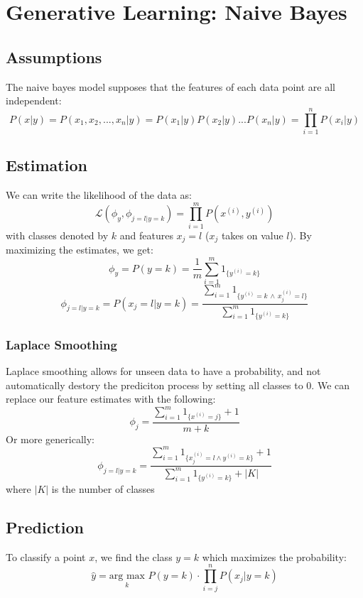 \documentclass[twoside,twocolumn]{article}
\begin{document}
\section{Generative Learning: Naive Bayes}
\subsection{Assumptions}
The naive bayes model supposes that the features of each data point are all
independent:
\begin{equation}
  P(x|y)=P(x_1,x_2,...,x_n|y)=P(x_1|y)P(x_2|y)...P(x_n|y)=\prod_{i=1}^nP(x_i|y)
\end{equation}
\subsection{Estimation}
We can write the likelihood of the data as:
\begin{equation}
  \mathcal{L}(\phi_y, \phi_{j=l|y=k}) = \prod_{i=1}^m P(x^{(i)}, y^{(i)})
\end{equation}
with classes denoted by $k$ and features $x_j = l$ ($x_j$ takes on value $l$).
By maximizing the estimates, we get:
\begin{equation}
  \phi_y = P(y=k)=\frac{1}{m} \sum_{i=1}^m 1_{\{y^{(i)}=k\}}
\end{equation}
\begin{equation}
  \phi_{j=l|y=k} = P(x_j=l|y=k)= \frac{ \sum_{i=1}^m 1_{\{y^{(i)}=k \, \wedge \, x_j^{(i)} = l\}} }{ \sum_{i=1}^m 1_{\{y^{(i)}=k\}} }
\end{equation}
\subsubsection{Laplace Smoothing}
Laplace smoothing allows for unseen data to have a probability, and not automatically
destory the prediciton process by setting all classes to $0$. We can replace
our feature estimates with the following:
\begin{equation}
  \phi_j = \frac{ \sum_{i=1}^m 1_{\{x^{(i)}=j\}} +1} { m + k }
\end{equation}
Or more generically:
\begin{equation}
  \phi_{j=l|y=k} = \frac{ \sum_{i=1}^m 1_{\{x_j^{(i)}=l \wedge y^{(i)} = k\}} + 1 } { \sum_{i=1}^m 1_{\{y^{(i)}=k\}} + |K| }
\end{equation}
where $|K|$ is the number of classes
\subsection{Prediction}
To classify a point $x$, we find the class $y=k$ which maximizes the probability:
\begin{equation}
  \hat{y} = \underset{k}{\textrm{arg max}} \,\, P(y=k) \cdot\prod_{i=j}^n P(x_j | y=k)
\end{equation}
\end{document}
